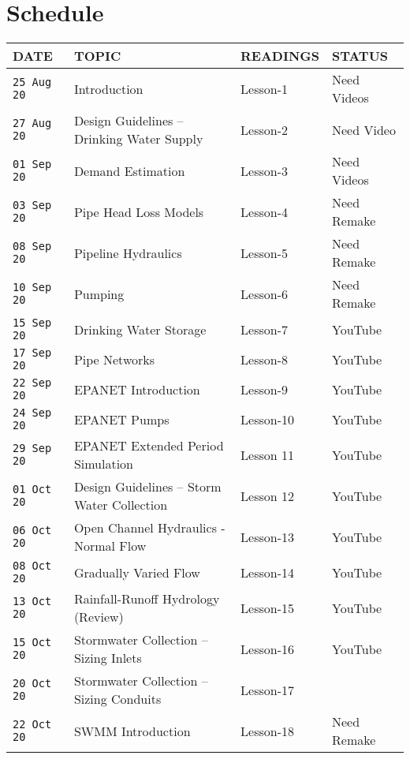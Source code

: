 \documentclass[12pt]{article}
\begin{document}
\clearpage
\section*{Schedule}
\begin{center}
\begin{table}[ht!]
   \begin{tabular}{| p{0.8in} | p{3.4in} | p{1.0in} | p{1.0in} |} 
\hline
\hline
DATE & TOPIC & READINGS & STATUS \\
\hline
\hline
\texttt{25 Aug 20} & Introduction & Lesson-1 & Need Videos \\
\texttt{27 Aug 20} & Design Guidelines -- Drinking Water Supply & Lesson-2 & Need Video\\
\hline
\texttt{01 Sep 20} & Demand Estimation & Lesson-3 & Need Videos \\
\texttt{03 Sep 20} & Pipe Head Loss Models & Lesson-4 & Need Remake \\
\hline
\texttt{08 Sep 20} & Pipeline Hydraulics & Lesson-5 & Need Remake \\
\texttt{10 Sep 20} & Pumping & Lesson-6 & Need Remake \\
\hline
\texttt{15 Sep 20} & Drinking Water Storage  & Lesson-7 & YouTube \\
\texttt{17 Sep 20} & Pipe Networks & Lesson-8 &  YouTube \\
\hline
\texttt{22 Sep 20} & EPANET Introduction & Lesson-9 & YouTube \\
\texttt{24 Sep 20} & EPANET Pumps & Lesson-10 & YouTube \\
\hline
\texttt{29 Sep 20} &  EPANET Extended Period Simulation  & Lesson 11  & YouTube  \\
\texttt{01 Oct 20} & Design Guidelines -- Storm Water Collection& Lesson 12 & YouTube  \\
\hline
\texttt{06 Oct 20} & Open Channel Hydraulics - Normal Flow & Lesson-13 & YouTube  \\
\texttt{08 Oct 20} & Gradually Varied Flow  & Lesson-14 & YouTube  \\
\hline
\texttt{13 Oct 20} & Rainfall-Runoff Hydrology (Review)  & Lesson-15 & YouTube \\
\texttt{15 Oct 20} & Stormwater Collection --  Sizing Inlets & Lesson-16 & YouTube  \\
\hline
\texttt{20 Oct 20} & Stormwater Collection --  Sizing Conduits & Lesson-17 &   \\
\texttt{22 Oct 20} & SWMM Introduction & Lesson-18 & Need Remake  \\

\end{tabular}
\end{table}
\end{center}
\end{document}

